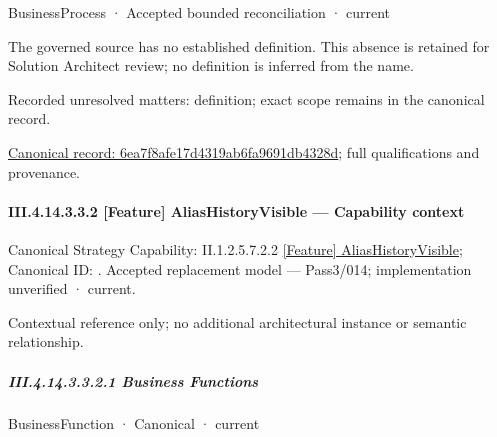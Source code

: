 \label{navigation:III.4.14.3.3.1.2.1}

\label{element:6ea7f8afe17d4319ab6fa9691db4328d}
{\small BusinessProcess · Accepted bounded reconciliation · current}\par

The governed source has no established definition. This absence is retained for Solution Architect review; no definition is inferred from the name.


{\small Recorded unresolved matters: definition; exact scope remains in the canonical record.}\par
{\footnotesize \href{../../../../../../../continuum/business/business-process/6ea7f8afe17d4319ab6fa9691db4328d.md}{Canonical record: 6ea7f8afe17d4319ab6fa9691db4328d}; full qualifications and provenance.}\par
\paragraph*{III.4.14.3.3.2 [Feature] AliasHistoryVisible — Capability context}
\label{navigation:III.4.14.3.3.2}

{\small Canonical Strategy Capability: II.1.2.5.7.2.2 \hyperref[element:5d8ab81e7a9748e9ac611b3c207eef38]{[Feature] AliasHistoryVisible}; Canonical ID: \texttt{}. Accepted replacement model — Pass3/014; implementation unverified · current.}\par
Contextual reference only; no additional architectural instance or semantic relationship.\par
\subparagraph*{III.4.14.3.3.2.1 Business Functions}
\label{navigation:III.4.14.3.3.2.1}

\label{navigation:III.4.14.3.3.2.1.1}

\label{element:9db2528e180a418eacbad3acf86b3956}
{\small BusinessFunction · Canonical · current}\par

